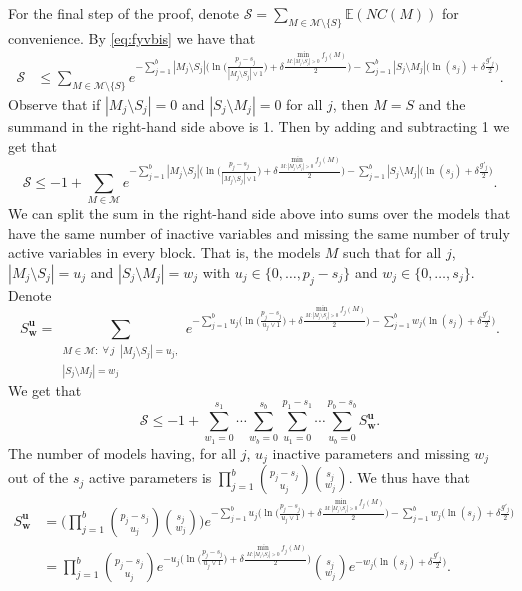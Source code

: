 \documentclass[
  12pt]{article}
\newcommand{\E}{\mathbb{E}}
\newcommand{\M}{\mathcal{M}}
\newcommand{\bu}{\mathbf{u}}
\newcommand{\bw}{\mathbf{w}}
\begin{document}
For the final step of the proof, denote $\mathcal{S}= \sum_{M \in \M\setminus \{S\}} \E\left(NC(M)\right)$ for convenience. By \eqref{eq:fyvbis} we have that
\begin{align*}
    \mathcal{S} &\leq \sum_{M \in \M\setminus \{S\}}e^{- \sum_{j=1}^b |M_j\setminus S_j|\big(\ln\big(\tfrac{p_j-s_j}{|M_j\setminus S_j|\vee 1}\big)+\delta \tfrac{\min_{M: |M_j\setminus S_j|>0}f_j(M)}{2}\big)-\sum_{j=1}^b |S_j\setminus M_j|\big(\ln(s_j)+\delta \tfrac{g'_j}{2}\big)}.
\end{align*}
Observe that if $|M_j\setminus S_j|=0$ and $|S_j\setminus M_j|=0$ for all $j$, then $M=S$ and the summand in the right-hand side above is 1. Then by adding and subtracting 1 we get that
$$\mathcal{S} \leq -1+\sum_{M \in \M}e^{- \sum_{j=1}^b |M_j\setminus S_j|\big(\ln\big(\tfrac{p_j-s_j}{|M_j\setminus S_j|\vee 1}\big)+\delta \tfrac{\min_{M: |M_j\setminus S_j|>0}f_j(M)}{2}\big)-\sum_{j=1}^b |S_j\setminus M_j|\big(\ln(s_j)+\delta \tfrac{g'_j}{2}\big)}.$$
We can split the sum in the right-hand side above into sums over the models that have the same number of inactive variables and missing the same number of truly active variables in every block. That is, the models $M$ such that for all $j$, $|M_j\setminus S_j|=u_j$ and $|S_j\setminus M_j|=w_j$ with $u_j \in \{0,\ldots,p_j-s_j\}$ and $w_j \in \{0,\ldots,s_j\}$. Denote
$$S^{\bu}_{\bw}=\sum_{\substack{M \in \M:\;\forall \,j\;\; |M_j\setminus S_j|=u_j,\\ |S_j\setminus M_j|=w_j }} e^{- \sum_{j=1}^b u_j\big(\ln\big(\tfrac{p_j-s_j}{u_j\vee 1}\big)+\delta \tfrac{\min_{M: |M_j\setminus S_j|>0}f_j(M)}{2}\big)-\sum_{j=1}^b w_j\big(\ln(s_j)+\delta \tfrac{g'_j}{2}\big)}.$$
We get that
\begin{equation}\label{eq:uygfewbis}
    \mathcal{S} \leq -1+\sum_{w_1=0}^{s_1}\cdots\sum_{w_b=0}^{s_b}\sum_{u_1=0}^{p_1-s_1}\cdots\sum_{u_b=0}^{p_b-s_b}S^{\bu}_{\bw}.
\end{equation}
The number of models having, for all $j$, $u_j$ inactive parameters and missing $w_j$ out of the $s_j$ active parameters %
is $\prod_{j=1}^b {\binom{p_j-s_j}{u_j}}{\binom{s_j}{w_j}}$. We thus have that
\begin{align*}
    S^{\bu}_{\bw}&= \bigg(\prod_{j=1}^b {\binom{p_j-s_j}{u_j}}{\binom{s_j}{w_j}}\bigg)e^{- \sum_{j=1}^b u_j\big(\ln\big(\tfrac{p_j-s_j}{u_j\vee 1}\big)+\delta \tfrac{\min_{M: |M_j\setminus S_j|>0}f_j(M)}{2}\big)-\sum_{j=1}^b w_j\big(\ln(s_j)+\delta \tfrac{g'_j}{2}\big)} \\
    &= \prod_{j=1}^b {\binom{p_j-s_j}{u_j}}e^{- u_j\big(\ln\big(\tfrac{p_j-s_j}{u_j\vee 1}\big)+\delta \tfrac{\min_{M: |M_j\setminus S_j|>0}f_j(M)}{2}\big)}{\binom{s_j}{w_j}}e^{-w_j\big(\ln(s_j)+\delta \tfrac{g'_j}{2}\big)}.
\end{align*}
\end{document}
